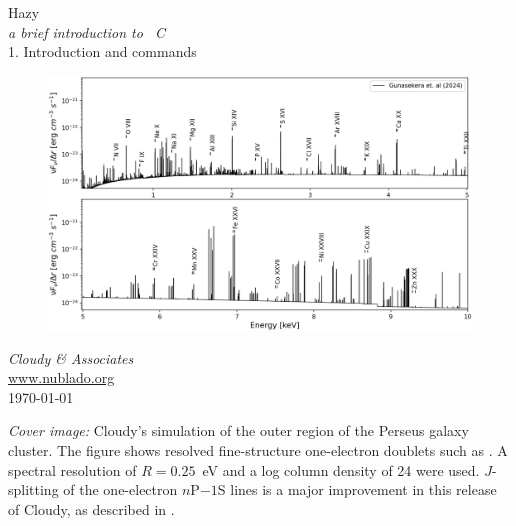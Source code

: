 \documentclass[12pt]{book}
\begin{document}
\frontmatter

\begin{titlepage}
\begin{center}

\Huge
Hazy\\
\Large
\emph{a brief introduction to \Cloudy\ C\VERSION}\\
\LARGE
1. Introduction and commands

\begin{figure}
\begin{center}
\hspace*{-1cm}
\includegraphics[clip=on,width=\columnwidth,height=0.6\textheight,keepaspectratio]{Gunasekera2024.png}
\end{center}
\end{figure}

\vspace{10 mm }
\LARGE
\emph{Cloudy \& Associates} \\
\Large
\href{http://www.nublado.org}{www.nublado.org} \\
\normalsize
\today
\end{center}
\end{titlepage}

\clearpage

\vspace{5mm}
\noindent
{\small
{\em Cover image:}
Cloudy's simulation of the outer region of the Perseus galaxy cluster. 
The figure shows resolved fine-structure one-electron doublets
such as .
A spectral resolution of $R=0.25$~eV and a log column density of 24 were used. $J$-splitting of the 
one-electron $n$P$-1$S lines is a major improvement in this
release of Cloudy, as described in \citet{2024arXiv241201606G}.
}
\clearpage
\end{document}
